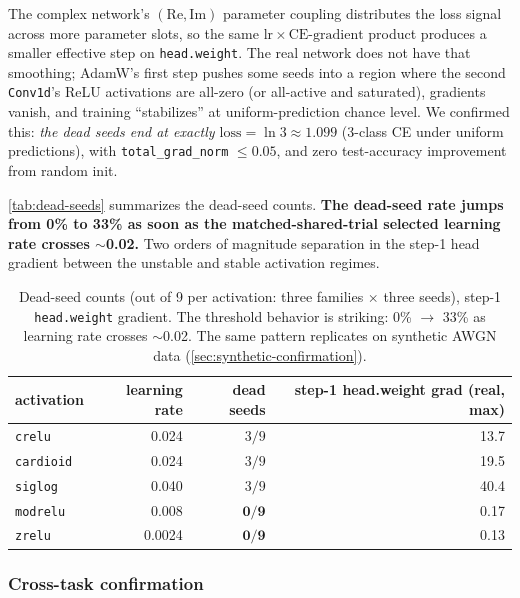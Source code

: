 \documentclass{article}
\providecommand{\Cref}[1]{\autoref{#1}}
\newcommand{\code}[1]{\texttt{#1}}
\begin{document}
The complex network's $(\mathrm{Re}, \mathrm{Im})$ parameter coupling
distributes the loss signal across more parameter slots, so the same
$\mathrm{lr} \times \mathrm{CE\text{-}gradient}$ product produces a
smaller effective step on \code{head.weight}. The real network does
not have that smoothing; AdamW's first step pushes some seeds into a
region where the second \code{Conv1d}'s ReLU activations are all-zero
(or all-active and saturated), gradients vanish, and training
``stabilizes'' at uniform-prediction chance level. We confirmed this:
\emph{the dead seeds end at exactly $\mathrm{loss} = \ln 3 \approx
1.099$} (3-class CE under uniform predictions), with
\code{total\_grad\_norm} $\leq 0.05$, and zero test-accuracy
improvement from random init.

\Cref{tab:dead-seeds} summarizes the dead-seed counts. \textbf{The
dead-seed rate jumps from 0\% to 33\% as soon as the
matched-shared-trial selected learning rate crosses $\sim$0.02.} Two orders of
magnitude separation in the step-1 head gradient between the unstable
and stable activation regimes.

\begin{table}[t]
  \centering
  \caption{Dead-seed counts (out of 9 per activation: three families
    $\times$ three seeds), step-1 \code{head.weight} gradient. The
    threshold behavior is striking: 0\% $\to$ 33\% as learning rate crosses
    $\sim$0.02. The same pattern replicates on synthetic AWGN data
    (\Cref{sec:synthetic-confirmation}).}
  \label{tab:dead-seeds}
  \begin{tabular}{lrrr}
    \toprule
    activation & learning rate & dead seeds & step-1 head.weight grad (real, max) \\
    \midrule
    \code{crelu} & 0.024 & $3/9$ & 13.7 \\
    \code{cardioid} & 0.024 & $3/9$ & 19.5 \\
    \code{siglog} & 0.040 & $3/9$ & 40.4 \\
    \code{modrelu} & 0.008 & $\mathbf{0/9}$ & 0.17 \\
    \code{zrelu} & 0.0024 & $\mathbf{0/9}$ & 0.13 \\
    \bottomrule
  \end{tabular}
\end{table}

\subsubsection{Cross-task confirmation}
\label{sec:synthetic-confirmation}
\end{document}
